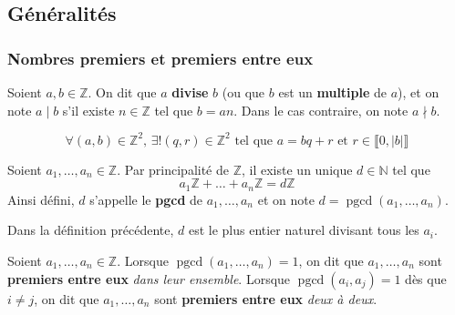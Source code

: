 




  \subsection{Généralités}

  \subsubsection{Nombres premiers et premiers entre eux}


  \begin{definition}
    Soient $a, b \in \mathbb{Z}$. On dit que $a$ \textbf{divise} $b$ (ou que $b$ est un \textbf{multiple} de $a$), et on note $a \mid b$ s'il existe $n \in \mathbb{Z}$ tel que $b = an$. Dans le cas contraire, on note $a \nmid b$.
  \end{definition}

  \begin{theorem}
    \[ \forall (a, b) \in \mathbb{Z}^2, \, \exists! (q, r) \in \mathbb{Z}^2 \text{ tel que } a=bq+r \text{ et } r \in \llbracket 0, \vert b \vert \rrbracket \]
  \end{theorem}

  \begin{definition}
    Soient $a_1, \dots, a_n \in \mathbb{Z}$. Par principalité de $\mathbb{Z}$, il existe un unique $d \in \mathbb{N}$ tel que
    \[ a_1\mathbb{Z} + \dots + a_n\mathbb{Z} = d\mathbb{Z} \]
    Ainsi défini, $d$ s'appelle le \textbf{pgcd} de $a_1, \dots, a_n$ et on note $d = \operatorname{pgcd}(a_1, \dots, a_n)$.
  \end{definition}

  \begin{remark}
    Dans la définition précédente, $d$ est le plus entier naturel divisant tous les $a_i$.
  \end{remark}

  \begin{definition}
    Soient $a_1, \dots, a_n \in \mathbb{Z}$. Lorsque $\operatorname{pgcd}(a_1, \dots, a_n) = 1$, on dit que $a_1, \dots, a_n$ sont \textbf{premiers entre eux} \textit{dans leur ensemble}. Lorsque $\operatorname{pgcd}(a_i, a_j) = 1$ dès que $i \neq j$, on dit que $a_1, \dots, a_n$ sont \textbf{premiers entre eux} \textit{deux à deux}.
  \end{definition}

